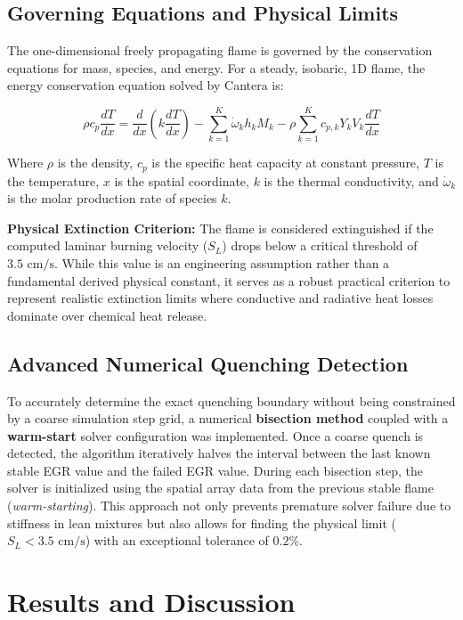 \documentclass[11pt,a4paper]{article}
\begin{document}
\subsection{Governing Equations and Physical Limits}
The one-dimensional freely propagating flame is governed by the conservation equations for mass, species, and energy. For a steady, isobaric, 1D flame, the energy conservation equation solved by Cantera is:

\begin{equation}
    \rho c_p \frac{dT}{dx} = \frac{d}{dx}\left( k \frac{dT}{dx} \right) - \sum_{k=1}^{K} \dot{\omega}_k h_k M_k - \rho \sum_{k=1}^{K} c_{p,k} Y_k V_k \frac{dT}{dx}
\end{equation}

Where $\rho$ is the density, $c_p$ is the specific heat capacity at constant pressure, $T$ is the temperature, $x$ is the spatial coordinate, $k$ is the thermal conductivity, and $\dot{\omega}_k$ is the molar production rate of species $k$.

\textbf{Physical Extinction Criterion:} The flame is considered extinguished if the computed laminar burning velocity ($S_L$) drops below a critical threshold of $3.5 \text{ cm/s}$. While this value is an engineering assumption rather than a fundamental derived physical constant, it serves as a robust practical criterion to represent realistic extinction limits where conductive and radiative heat losses dominate over chemical heat release.
\vspace{1cm}
\subsection{Advanced Numerical Quenching Detection}
To accurately determine the exact quenching boundary without being constrained by a coarse simulation step grid, a numerical \textbf{bisection method} coupled with a \textbf{warm-start} solver configuration was implemented. Once a coarse quench is detected, the algorithm iteratively halves the interval between the last known stable EGR value and the failed EGR value. During each bisection step, the solver is initialized using the spatial array data from the previous stable flame (\textit{warm-starting}). This approach not only prevents premature solver failure due to stiffness in lean mixtures but also allows for finding the physical limit ($S_L < 3.5 \text{ cm/s}$) with an exceptional tolerance of $0.2\%$.
\newpage
\section{Results and Discussion}
\end{document}
